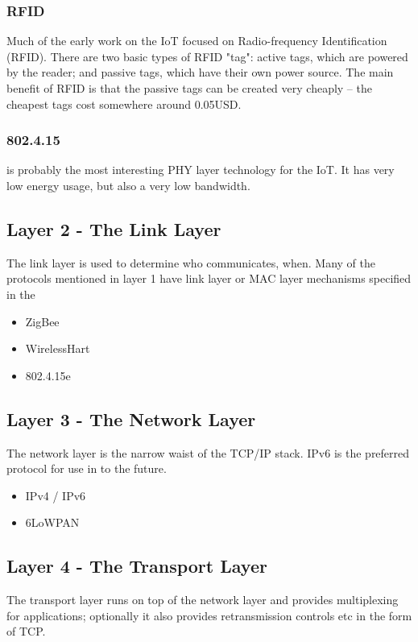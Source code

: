 \documentclass[journal]{IEEEtran}
\begin{document}
\subsubsection{RFID}
Much of the early work on the IoT focused on Radio-frequency Identification
(RFID). There are two basic types of RFID "tag": active tags, which are powered
by the reader; and passive tags, which have their own power source. The main
benefit of RFID is that the passive tags can be created very cheaply -- the
cheapest tags cost somewhere around 0.05USD. 

\subsubsection{802.4.15}
is probably the most interesting PHY layer technology for the IoT. It has very
low energy usage, but also a very low bandwidth. 

\subsection{Layer 2 - The Link Layer}
The link layer is used to determine who communicates, when. Many of the protocols mentioned in layer 1 have link layer or MAC layer mechanisms specified in the 

\begin{itemize}
\item ZigBee
\item WirelessHart
\item 802.4.15e
\end{itemize}

\subsection{Layer 3 - The Network Layer}
The network layer is the narrow waist of the TCP/IP stack. IPv6 is the
preferred protocol for use in to the future.

\begin{itemize}
\item IPv4 / IPv6
\item 6LoWPAN
\end{itemize}

\subsection{Layer 4 - The Transport Layer}
The transport layer runs on top of the network layer and provides multiplexing
for applications; optionally it also provides retransmission controls etc in
the form of TCP. 
\end{document}
